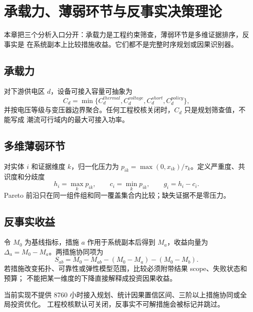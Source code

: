 \section{承载力、薄弱环节与反事实决策理论}\label{sec:analysis-theory}

\begin{theorynote}
本章把三个分析入口分开：承载力是工程约束筛查，薄弱环节是多维证据排序，反事实是
在系统副本上比较措施收益。它们都不是完整时序规划或因果识别器。
\end{theorynote}

\subsection{承载力}
对下游供电区 $d$，设备可接入容量可抽象为
\begin{equation}
C_d=\min\{C_d^{thermal},C_d^{voltage},C_d^{short},C_d^{policy}\},
\end{equation}
并按电压等级与变压器边界聚合。任何工程校核关闭时，$C_d$ 只是规划筛查值，不能写成
潮流可行域内的最大可接入功率。

\subsection{多维薄弱环节}
对实体 $i$ 和证据维度 $k$，归一化压力为
$p_{ik}=\max(0,x_{ik})/\tau_k$。定义严重度、共识度和分歧度
\begin{equation}
h_i=\max_k p_{ik},\qquad c_i=\min_k p_{ik},\qquad g_i=h_i-c_i.
\end{equation}
Pareto 前沿只在同一组件组和同一覆盖集合内比较；缺失证据不是零压力。

\subsection{反事实收益}
令 $M_0$ 为基线指标，措施 $a$ 作用于系统副本后得到 $M_a$，收益向量为
$\Delta_a=M_0-M_a$。两措施协同项为
\begin{equation}
S_{ab}=M_0-M_{ab}-(M_0-M_a)-(M_0-M_b).
\end{equation}
若措施改变拓扑、可靠性或弹性模型范围，比较必须附带结果 scope、失败状态和预算；
不能把某一维度的下降直接解释成投资因果收益。

\begin{gapnote}
当前实现不提供 8760 小时接入规划、统计因果置信区间、三阶以上措施协同或全局投资优化。
工程校核默认可关闭，反事实不可解措施会被标记并跳过。
\end{gapnote}

